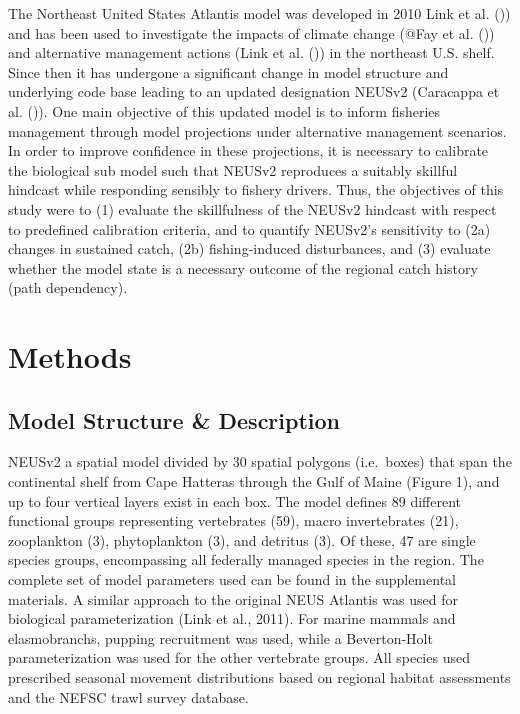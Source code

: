 \documentclass[
]{article}
\begin{document}
The Northeast United States Atlantis model was developed in 2010 Link et al. ()) and has been used to investigate the impacts of climate change (@Fay et al. ()) and alternative management actions (Link et al. ()) in the northeast U.S. shelf. Since then it has undergone a significant change in model structure and underlying code base leading to an updated designation NEUSv2 (Caracappa et al. ()). One main objective of this updated model is to inform fisheries management through model projections under alternative management scenarios. In order to improve confidence in these projections, it is necessary to calibrate the biological sub model such that NEUSv2 reproduces a suitably skillful hindcast while responding sensibly to fishery drivers. Thus, the objectives of this study were to (1) evaluate the skillfulness of the NEUSv2 hindcast with respect to predefined calibration criteria, and to quantify NEUSv2's sensitivity to (2a) changes in sustained catch, (2b) fishing-induced disturbances, and (3) evaluate whether the model state is a necessary outcome of the regional catch history (path dependency).

\section{Methods}\label{methods}

\subsection{Model Structure \& Description}\label{model-structure-description}

NEUSv2 a spatial model divided by 30 spatial polygons (i.e.~boxes) that span the continental shelf from Cape Hatteras through the Gulf of Maine (Figure 1), and up to four vertical layers exist in each box. The model defines 89 different functional groups representing vertebrates (59), macro invertebrates (21), zooplankton (3), phytoplankton (3), and detritus (3). Of these, 47 are single species groups, encompassing all federally managed species in the region. The complete set of model parameters used can be found in the supplemental materials. A similar approach to the original NEUS Atlantis was used for biological parameterization (Link et al., 2011). For marine mammals and elasmobranchs, pupping recruitment was used, while a Beverton-Holt parameterization was used for the other vertebrate groups. All species used prescribed seasonal movement distributions based on regional habitat assessments and the NEFSC trawl survey database.
\end{document}
